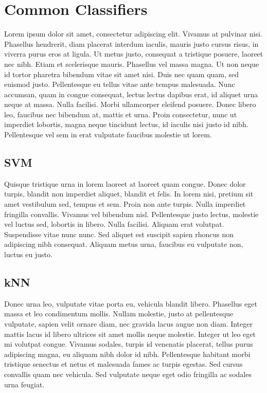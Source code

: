 \chapter{Common Classifiers}

Lorem ipsum dolor sit amet, consectetur adipiscing elit. Vivamus at pulvinar nisi. Phasellus hendrerit, diam placerat interdum iaculis, mauris justo cursus risus, in viverra purus eros at ligula. Ut metus justo, consequat a tristique posuere, laoreet nec nibh. Etiam et scelerisque mauris. Phasellus vel massa magna. Ut non neque id tortor pharetra bibendum vitae sit amet nisi. Duis nec quam quam, sed euismod justo. Pellentesque eu tellus vitae ante tempus malesuada. Nunc accumsan, quam in congue consequat, lectus lectus dapibus erat, id aliquet urna neque at massa. Nulla facilisi. Morbi ullamcorper eleifend posuere. Donec libero leo, faucibus nec bibendum at, mattis et urna. Proin consectetur, nunc ut imperdiet lobortis, magna neque tincidunt lectus, id iaculis nisi justo id nibh. Pellentesque vel sem in erat vulputate faucibus molestie ut lorem.

\section{SVM}

Quisque tristique urna in lorem laoreet at laoreet quam congue. Donec dolor turpis, blandit non imperdiet aliquet, blandit et felis. In lorem nisi, pretium sit amet vestibulum sed, tempus et sem. Proin non ante turpis. Nulla imperdiet fringilla convallis. Vivamus vel bibendum nisl. Pellentesque justo lectus, molestie vel luctus sed, lobortis in libero. Nulla facilisi. Aliquam erat volutpat. Suspendisse vitae nunc nunc. Sed aliquet est suscipit sapien rhoncus non adipiscing nibh consequat. Aliquam metus urna, faucibus eu vulputate non, luctus eu justo.

\section{kNN}

Donec urna leo, vulputate vitae porta eu, vehicula blandit libero. Phasellus eget massa et leo condimentum mollis. Nullam molestie, justo at pellentesque vulputate, sapien velit ornare diam, nec gravida lacus augue non diam. Integer mattis lacus id libero ultrices sit amet mollis neque molestie. Integer ut leo eget mi volutpat congue. Vivamus sodales, turpis id venenatis placerat, tellus purus adipiscing magna, eu aliquam nibh dolor id nibh. Pellentesque habitant morbi tristique senectus et netus et malesuada fames ac turpis egestas. Sed cursus convallis quam nec vehicula. Sed vulputate neque eget odio fringilla ac sodales urna feugiat.

